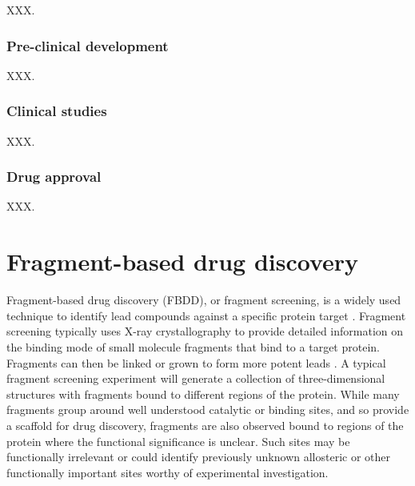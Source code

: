 XXX.

\subsubsection{Pre-clinical development}

XXX.

\subsubsection{Clinical studies}

XXX.

\subsubsection{Drug approval}

XXX.



\section{Fragment-based drug discovery}

Fragment-based drug discovery (FBDD), or fragment screening, is a widely used technique to identify lead compounds against a specific protein target \cite{MURRAY_2009_FBDD}. Fragment screening typically uses X-ray crystallography to provide detailed information on the binding mode of small molecule fragments that bind to a target protein. Fragments can then be linked or grown to form more potent leads \cite{CONGREVE_2003_RO3, REES_2004_FBLD, SCHIEBEL_2016_FRAGMENTS}. A typical fragment screening experiment will generate a collection of three-dimensional structures with fragments bound to different regions of the protein. While many fragments group around well understood catalytic or binding sites, and so provide a scaffold for drug discovery, fragments are also observed bound to regions of the protein where the functional significance is unclear. Such sites may be functionally irrelevant or could identify previously unknown allosteric or other functionally important sites worthy of experimental investigation. 


